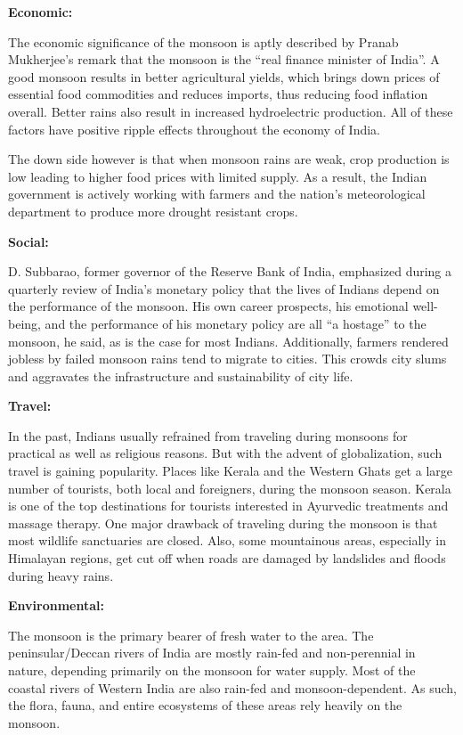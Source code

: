 \documentclass[12pt,openany]{book}
\begin{document}
\textbf{Economic:}

The economic significance of the monsoon is aptly described by Pranab Mukherjee's remark that the monsoon is the ``real finance minister of India''. A good monsoon results in better agricultural yields, which brings down prices of essential food commodities and reduces imports, thus reducing food inflation overall. Better rains also result in increased hydroelectric production. All of these factors have positive ripple effects throughout the economy of India.

The down side however is that when monsoon rains are weak, crop production is low leading to higher food prices with limited supply. As a result, the Indian government is actively working with farmers and the nation's meteorological department to produce more drought resistant crops.

\textbf{Social:}

D. Subbarao, former governor of the Reserve Bank of India, emphasized during a quarterly review of India's monetary policy that the lives of Indians depend on the performance of the monsoon. His own career prospects, his emotional well-being, and the performance of his monetary policy are all ``a hostage'' to the monsoon, he said, as is the case for most Indians. Additionally, farmers rendered jobless by failed monsoon rains tend to migrate to cities. This crowds city slums and aggravates the infrastructure and sustainability of city life.

\textbf{Travel:}

In the past, Indians usually refrained from traveling during monsoons for practical as well as religious reasons. But with the advent of globalization, such travel is gaining popularity. Places like Kerala and the Western Ghats get a large number of tourists, both local and foreigners, during the monsoon season. Kerala is one of the top destinations for tourists interested in Ayurvedic treatments and massage therapy. One major drawback of traveling during the monsoon is that most wildlife sanctuaries are closed. Also, some mountainous areas, especially in Himalayan regions, get cut off when roads are damaged by landslides and floods during heavy rains.

\textbf{Environmental:}

The monsoon is the primary bearer of fresh water to the area. The peninsular/Deccan rivers of India are mostly rain-fed and non-perennial in nature, depending primarily on the monsoon for water supply. Most of the coastal rivers of Western India are also rain-fed and monsoon-dependent. As such, the flora, fauna, and entire ecosystems of these areas rely heavily on the monsoon.
\end{document}
